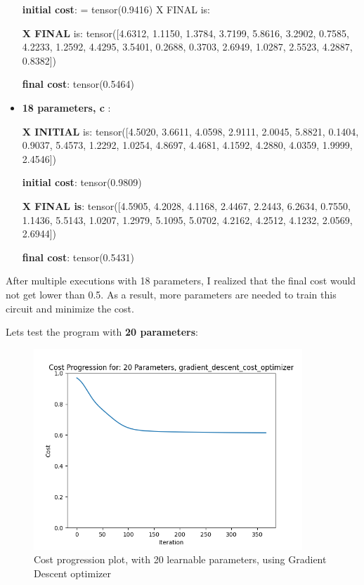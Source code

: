 \documentclass[inscr,ack,preface]{diphdthesis}
\begin{document}
\begin{itemize}
\textbf{initial cost}: = tensor(0.9416)
    X FINAL is:

\textbf{X FINAL} is: tensor([4.6312, 1.1150, 1.3784, 3.7199, 5.8616, 3.2902, 0.7585, 4.2233, 1.2592,
        4.4295, 3.5401, 0.2688, 0.3703, 2.6949, 1.0287, 2.5523, 4.2887, 0.8382])
        
\textbf{final cost}: tensor(0.5464)


\item \textbf{18 parameters, c }:

\textbf{X INITIAL} is:
 tensor([4.5020, 3.6611, 4.0598, 2.9111, 2.0045, 5.8821, 0.1404, 0.9037, 5.4573,
        1.2292, 1.0254, 4.8697, 4.4681, 4.1592, 4.2880, 4.0359, 1.9999, 2.4546])

\textbf{initial cost}: tensor(0.9809)

\textbf{X FINAL is}:
 tensor([4.5905, 4.2028, 4.1168, 2.4467, 2.2443, 6.2634, 0.7550, 1.1436, 5.5143,
        1.0207, 1.2979, 5.1095, 5.0702, 4.2162, 4.2512, 4.1232, 2.0569, 2.6944])

\textbf{final cost}: tensor(0.5431)

\end{itemize}

After multiple executions with 18 parameters, I realized that the final cost would not get lower than 0.5. As a result, more parameters are needed to train this circuit and minimize the cost. 

Lets test the program with \textbf{20 parameters}: 

\begin{figure}[ht]
\begin{center}
    \includegraphics[width=0.9\textwidth]{20.png}
    \caption{Cost progression plot, with 20 learnable parameters, using Gradient Descent optimizer} 
    \label{fig:enter-label}
    \end{center}
\end{figure}
\end{document}
